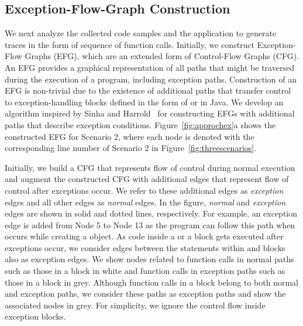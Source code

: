 \subsection{Exception-Flow-Graph Construction}
\vspace*{-2ex}
We next analyze the collected code samples and the application to generate traces in the form
of sequence of function calls. Initially, we construct Exception-Flow Graphs (EFG),
which are an extended form of Control-Flow Graphs (CFG).
An EFG provides a graphical representation of all paths
that might be traversed during the execution of a program, including exception paths. 
Construction of an EFG is non-trivial due to the existence of additional paths
that transfer control to exception-handling blocks 
defined in the form of  or  in Java.
We develop an algorithm inspired by Sinha and Harrold~\cite{exception:sinha}
for constructing EFGs with additional paths that describe
exception conditions. Figure~\ref{fig:approchex}a shows the constructed
EFG for Scenario 2, where each node is denoted with the corresponding 
line number of Scenario 2 in Figure~\ref{fig:threescenarios}.

Initially, we build a CFG that represents flow of control during
normal execution and augment the constructed CFG with
additional edges that represent flow of control after exceptions occur. 
We refer to these additional edges as \emph{exception} edges
and all other edges as \emph{normal} edges. In the figure, 
\emph{normal} and \emph{exception} edges are shown in solid and
dotted lines, respectively. For example, an exception
edge is added from Node 5 to Node 13 as the program can follow
this path when  occurs while creating a 
object. As code inside a  or 
a  block gets executed after exceptions occur,
we consider edges between the statements within  and  blocks also
as exception edges. We show nodes related to function calls in normal
paths such as those in a  block in white and function calls in exception paths
such as those in a  block in grey. Although function calls in a 
block belong to both normal and exception paths, we consider these paths as exception paths
and show the associated nodes in grey. For simplicity, we ignore the control flow inside
exception blocks.

